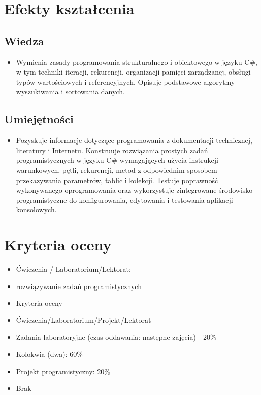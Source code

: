 \documentclass[12pt, a4paper]{article}
\begin{document}
\section{Efekty kształcenia}

\subsection*{Wiedza}
\begin{itemize}
  \item Wymienia zasady programowania strukturalnego i obiektowego w języku C\#, w tym techniki iteracji, rekurencji, organizacji pamięci zarządzanej, obsługi typów wartościowych i referencyjnych. Opisuje podstawowe algorytmy wyszukiwania i sortowania danych.
\end{itemize}

\subsection*{Umiejętności}
\begin{itemize}
  \item Pozyskuje informacje dotyczące programowania z dokumentacji technicznej, literatury i Internetu. Konstruuje rozwiązania prostych zadań programistycznych w języku C\# wymagających użycia instrukcji warunkowych, pętli, rekurencji, metod z odpowiednim sposobem przekazywania parametrów, tablic i kolekcji. Testuje poprawność wykonywanego oprogramowania oraz wykorzystuje zintegrowane środowisko programistyczne do konfigurowania, edytowania i testowania aplikacji konsolowych.
\end{itemize}

\section{Kryteria oceny}

\begin{itemize}
  \item Ćwiczenia / Laboratorium/Lektorat:
  \item rozwiązywanie zadań programistycznych
  \item Kryteria oceny
  \item Ćwiczenia/Laboratorium/Projekt/Lektorat
  \item Zadania laboratoryjne (czas oddawania: następne zajęcia) - 20\%
  \item Kolokwia (dwa): 60\%
  \item Projekt programistyczny: 20\%
  \item Brak
\end{itemize}
\end{document}
